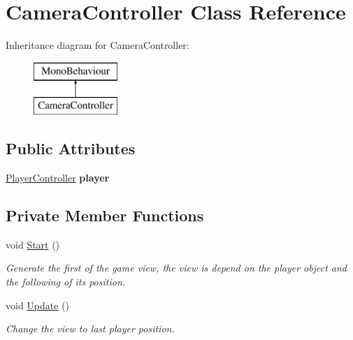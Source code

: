 \hypertarget{class_camera_controller}{}\section{Camera\+Controller Class Reference}
\label{class_camera_controller}
Inheritance diagram for Camera\+Controller\+:\begin{figure}[H]
\begin{center}
\leavevmode
\includegraphics[height=2.000000cm]{class_camera_controller}
\end{center}
\end{figure}
\subsection*{Public Attributes}
\begin{DoxyCompactItemize}
\item 
\hypertarget{class_camera_controller_ad203a3ed21fdf7dd5f7660aa3efb4505}{}\label{class_camera_controller_ad203a3ed21fdf7dd5f7660aa3efb4505} 
\hyperlink{class_player_controller}{Player\+Controller} {\bfseries player}
\end{DoxyCompactItemize}
\subsection*{Private Member Functions}
\begin{DoxyCompactItemize}
\item 
void \hyperlink{class_camera_controller_ad4a238c6f7db3ee003302a245d860860}{Start} ()
\begin{DoxyCompactList}\small\item\em Generate the first of the game view, the view is depend on the player object and the following of it\textquotesingle{}s position. \end{DoxyCompactList}\item 
void \hyperlink{class_camera_controller_a7c4f486f4bcbd1d54a346fdce9707bd5}{Update} ()
\begin{DoxyCompactList}\small\item\em Change the view to last player position. \end{DoxyCompactList}\end{DoxyCompactItemize}
